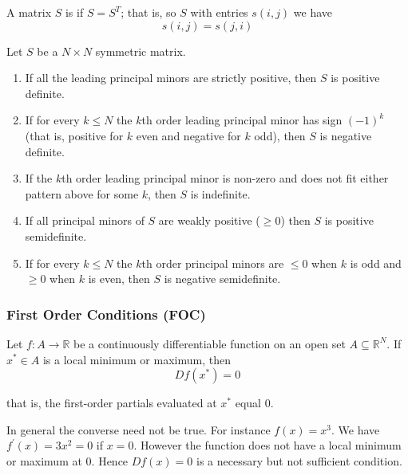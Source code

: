 \documentclass{article}
\begin{document}
\begin{definition}
  A matrix $S$ is  if $S = S^T$; that is, so $S$ with entries $s(i, j)$ we have
  \[
    s(i, j) = s(j, i)
  \]
\end{definition}

\begin{theorem}
  Let $S$ be a $N \times N$ symmetric matrix.
  \begin{enumerate}
    \item If all the leading principal minors are strictly positive, then $S$ is positive definite.

    \item If for every $k \le N$ the $k$th order leading principal minor has sign $(-1)^k$ (that is, positive for $k$ even and negative for $k$ odd), then $S$ is negative definite.

    \item If the $k$th order leading principal minor is non-zero and does not fit either pattern above for some $k$, then $S$ is indefinite.

    \item If all principal minors of $S$ are weakly positive ($\ge 0$) then $S$ is positive semidefinite.

    \item If for every $k \le N$ the $k$th order principal minors are $\le 0$ when $k$ is odd and $\ge 0$ when $k$ is even, then $S$ is negative semidefinite.
  \end{enumerate}
\end{theorem}

\subsubsection{First Order Conditions (FOC)}
\label{ssub:first_order_conditions_foc_}

\begin{theorem}
  Let $f: A \to \mathbb{R}$ be a continuously differentiable function on an open set $A \subseteq \mathbb{R}^N$. If $x^* \in A$ is a local minimum or maximum, then
  \[
    D f(x^*) = 0
  \]

  that is, the first-order partials evaluated at $x^*$ equal $0$.
\end{theorem}

\begin{remark}
  In general the converse need not be true. For instance $f(x) = x^3$. We have $f^\prime(x) = 3x^2 = 0$ if $x = 0$. However the function does not have a local minimum or maximum at $0$. Hence $D f(x) = 0$ is a necessary but not sufficient condition.
\end{remark}
\end{document}
